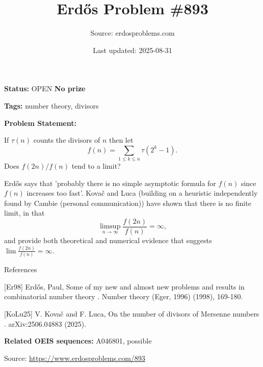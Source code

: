 \documentclass{article}
\title{Erd\H{o}s Problem \#893}
\date{Last updated: 2025-08-31}
\author{Source: erdosproblems.com}
\begin{document}
\maketitle

\noindent\textbf{Status:} OPEN \quad \textbf{No prize}

\noindent\textbf{Tags:} number theory, divisors

\medskip

\noindent\textbf{Problem Statement:}

If $\tau(n)$ counts the divisors of $n$ then let\[f(n)=\sum_{1\leq k\leq n}\tau(2^k-1).\]Does $f(2n)/f(n)$ tend to a limit?




Erd\H{o}s \cite{Er98} says that 'probably there is no simple asymptotic formula for $f(n)$ since $f(n)$ increases too fast'. Kova\v{c} and Luca \cite{KoLu25} (building on a heuristic independently found by Cambie (personal communication)) have shown that there is no finite limit, in that\[\limsup_{n\to \infty}\frac{f(2n)}{f(n)}=\infty,\]and provide both theoretical and numerical evidence that suggests $\lim \frac{f(2n)}{f(n)}=\infty$.




References

[Er98] Erd\H{o}s, Paul, Some of my new and almost new problems and results in combinatorial number theory . Number theory (Eger, 1996) (1998), 169-180.

[KoLu25] V. Kova\v{c} and F. Luca, On the number of divisors of Mersenne numbers . arXiv:2506.04883 (2025).

\noindent\textbf{Related OEIS sequences:} A046801, possible


\bigskip
\noindent\small{Source: \url{https://www.erdosproblems.com/893}}
\end{document}
